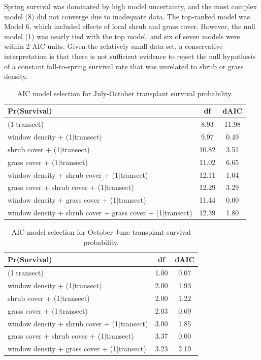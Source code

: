 \documentclass[11pt]{article}\usepackage[]{graphicx}\usepackage[]{color}
\begin{document}
Spring survival was dominated by high model uncertainty, and the most complex model (8) did not converge due to inadequate data. 
The top-ranked model was Model 6, which included effects of local shrub and grass cover.
However, the null model (1) was nearly tied with the top model, and six of seven models were within 2 AIC units. 
Given the relatively small data set, a conservative interpretation is that there is not sufficient evidence to reject the null hypothesis of a constant fall-to-spring survival rate that was unrelated to shrub or grass density. 

\begin{table}[ht]
\centering
\begin{tabular}{|p{12cm}|c|c|}
  \hline
Pr(Survival) & df & dAIC \\ 
  \hline
(1$|$transect) & 8.93 & 11.98 \\ 
  window density + (1$|$transect) & 9.97 & 0.49 \\ 
  shrub cover + (1$|$transect) & 10.82 & 3.51 \\ 
  grass cover + (1$|$transect) & 11.02 & 6.65 \\ 
  window density + shrub cover + (1$|$transect) & 12.11 & 1.04 \\ 
  grass cover + shrub cover + (1$|$transect) & 12.29 & 3.29 \\ 
  window density + grass cover + (1$|$transect) & 11.44 & 0.00 \\ 
  window density + shrub cover + grass cover + (1$|$transect) & 12.39 & 1.80 \\ 
   \hline
\end{tabular}
\caption{AIC model selection for July-October transplant survival probability.} 
\label{tab:fall_aic}
\end{table}


\begin{table}[ht]
\centering
\begin{tabular}{|p{12cm}|c|c|}
  \hline
Pr(Survival) & df & dAIC \\ 
  \hline
(1$|$transect) & 1.00 & 0.07 \\ 
  window density + (1$|$transect) & 2.00 & 1.93 \\ 
  shrub cover + (1$|$transect) & 2.00 & 1.22 \\ 
  grass cover + (1$|$transect) & 2.03 & 0.69 \\ 
  window density + shrub cover + (1$|$transect) & 3.00 & 1.85 \\ 
  grass cover + shrub cover + (1$|$transect) & 3.37 & 0.00 \\ 
  window density + grass cover + (1$|$transect) & 3.23 & 2.19 \\ 
   \hline
\end{tabular}
\caption{AIC model selection for October-June transplant survival probability.} 
\label{tab:spring_aic}
\end{table}
\end{document}
